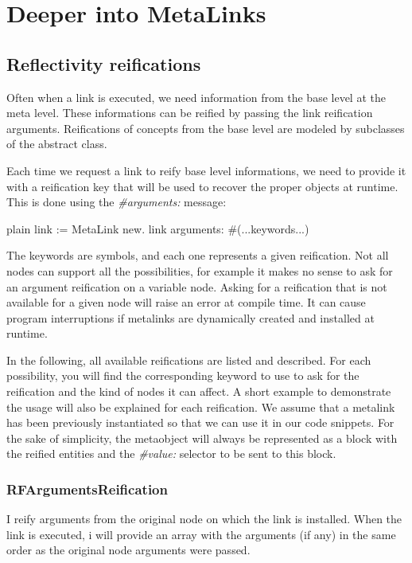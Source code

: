 \documentclass[10pt,twoside,english]{_support/latex/sbabook/sbabook}
\begin{document}
\frontmatter
\pagestyle{plain}

\tableofcontents*
\clearpage\listoffigures

\mainmatter

\chapter{Deeper into MetaLinks}\section{Reflectivity reifications}
Often when a link is executed, we need information from the base level at the meta level. These informations can be reified by passing the link reification arguments. Reifications of concepts from the base level are modeled by subclasses of the  abstract class.

Each time we request a link to reify base level informations, we need to provide it with a reification key that will be used to recover the proper objects at runtime. This is done using the \textit{\#arguments:} message: 

\begin{displaycode}{plain}
link := MetaLink new.
link arguments: #(...keywords...)
\end{displaycode}

The keywords are symbols, and each one represents a given reification. Not all nodes can support all the possibilities, for example it makes no sense to ask for an argument reification on a variable node. Asking for a reification that is not available for a given node will raise an error at compile time. It can cause program interruptions if metalinks are dynamically created and installed at runtime.

In the following, all available reifications are listed and described. For each possibility, you will find the corresponding keyword to use to ask for the reification and the kind of nodes it can affect. A short example to demonstrate the usage will also be explained for each reification. We assume that a metalink has been previously instantiated so that we can use it in our code snippets. For the sake of simplicity, the metaobject will always be represented as a block with the reified entities and the \textit{\#value:} selector to be sent to this block.
\subsection{RFArgumentsReification}
I reify arguments from the original node on which the link is installed. When the link is executed, i will provide an array with the arguments (if any) in the same order as the original node arguments were passed.
\end{document}
